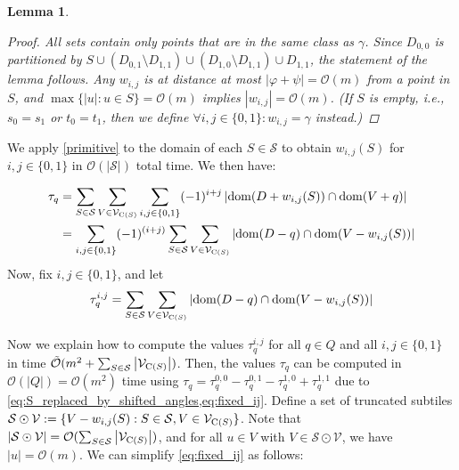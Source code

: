\documentclass[a4paper,11pt]{article}
\let\Cref\cref
\newtheorem{lemma}{Lemma}[section]
\renewcommand{\O}{\mathcal{O}}
\newcommand{\tO}{\tilde{\mathcal{O}}}
\renewcommand{\S}{\mathcal{S}}
\newcommand{\V}{\mathcal{V}}
\renewcommand{\phi}{\varphi}
\newcommand{\absolute}[1]{\left\lvert#1\right\rvert}
\begin{document}
\begin{lemma}
\begin{proof}
\vspace{.5\baselineskip}

All sets contain only points that are in the same class as $\gamma$. 
Since $D_{0,0}$ is partitioned by $S \cup (D_{0, 1}\setminus D_{1, 1}) \cup (D_{1, 0}\setminus D_{1, 1}) \cup D_{1, 1}$, the statement of the lemma follows. 
Any $w_{i, j}$ is at distance at most $\absolute{\phi + \psi} = \O(m)$ from a point in $S$, and $\max \{\absolute{u} : u \in S\} = \O(m)$ implies $\absolute{w_{i,j}} = \O(m)$. 
(If $S$ is empty, i.e., $s_0 = s_1$ or $t_0 = t_1$, then we define $\forall i,j\in\{0, 1\} : w_{i,j} = \gamma$ instead.)
\end{proof}

\end{lemma}


We apply \Cref{primitive} to the domain of each $S\in \S$ to obtain $w_{i, j}(S)$ for $i,j \in \{0,1\}$ in $\O(\absolute{\S})$ total time. We then have:

\begin{align}
\label{eq:S_replaced_by_shifted_angles}
\begin{split}
\tau_q &= \sum_{S \in \S} \sum_{V \in \V_{\getchar{S}}} \sum_{i,j \in \{0,1\}} (-1)^{i+j} \absolute{\d{D+w_{i, j}(S)} \cap \d{V + q}} \\
& = \sum_{i,j \in \{0,1\}} (-1)^{(i+j)} \sum_{S \in \S} \sum_{V \in \V_{\getchar{S}}} \absolute{\d{D-q} \cap \d{V-w_{i, j}(S)}}
\end{split}
\end{align}
%
Now, fix $i,j \in \{0,1\}$, and let 
%
\begin{equation}
\label{eq:fixed_ij}
\tau_q^{i,j} = \sum_{S \in \S} \sum_{V \in \V_{\getchar{S}}} \absolute{\d{D-q} \cap \d{V-w_{i, j}(S)}}
\end{equation}

Now we explain how to compute the values $\tau_q^{i,j}$ for all $q \in Q$ and all $i,j \in \{0,1\}$ in time $\tO(m^2 + \sum_{S \in \S} \absolute{\V_{\getchar{S}}})$. Then, the values $\tau_q$ can be computed in $\O(\absolute{Q}) = \O(m^2)$ time using $\tau_q = \tau^{0,0}_q - \tau^{0,1}_q - \tau^{1,0}_q + \tau^{1,1}_q$ due to \cref{eq:S_replaced_by_shifted_angles,eq:fixed_ij}. 
Define a set of truncated subtiles $\S \odot \V := \{V-w_{i, j}(S) : S \in \S, V \in \V_{\getchar{S}}\}$.  Note that $\absolute{\S \odot \V} = \O(\sum_{S \in \S} \absolute{\V_{\getchar{S}}})$, and for all $u \in V$ with $V \in \S \odot \V$, we have $\absolute{u} = \O(m)$. We can simplify \cref{eq:fixed_ij} as follows:
\end{document}
